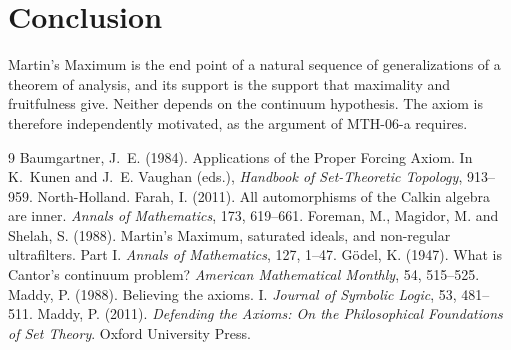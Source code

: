 \documentclass{situationist-preprint}
\begin{document}
\section{Conclusion}

Martin's Maximum is the end point of a natural sequence of generalizations of a theorem of analysis, and its support is the support that maximality and fruitfulness give. Neither depends on the continuum hypothesis. The axiom is therefore independently motivated, as the argument of MTH-06-a requires.

\begin{thebibliography}{9}\small
{} Baumgartner, J.~E. (1984). Applications of the Proper Forcing Axiom. In K.~Kunen and J.~E. Vaughan (eds.), \emph{Handbook of Set-Theoretic Topology}, 913--959. North-Holland.
 Farah, I. (2011). All automorphisms of the Calkin algebra are inner. \emph{Annals of Mathematics}, 173, 619--661.
 Foreman, M., Magidor, M. and Shelah, S. (1988). Martin's Maximum, saturated ideals, and non-regular ultrafilters. Part I. \emph{Annals of Mathematics}, 127, 1--47.
 G\"odel, K. (1947). What is Cantor's continuum problem? \emph{American Mathematical Monthly}, 54, 515--525.
 Maddy, P. (1988). Believing the axioms. I. \emph{Journal of Symbolic Logic}, 53, 481--511.
 Maddy, P. (2011). \emph{Defending the Axioms: On the Philosophical Foundations of Set Theory}. Oxford University Press.
\end{thebibliography}
\end{document}
